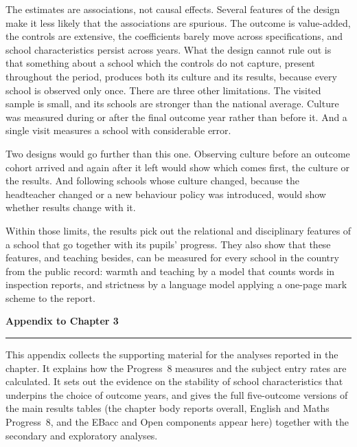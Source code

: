 The estimates are associations, not causal effects. Several features of the design make it less likely that the associations are spurious. The outcome is value-added, the controls are extensive, the coefficients barely move across specifications, and school characteristics persist across years. What the design cannot rule out is that something about a school which the controls do not capture, present throughout the period, produces both its culture and its results, because every school is observed only once. There are three other limitations. The visited sample is small, and its schools are stronger than the national average. Culture was measured during or after the final outcome year rather than before it. And a single visit measures a school with considerable error.

Two designs would go further than this one. Observing culture before an outcome cohort arrived and again after it left would show which comes first, the culture or the results. And following schools whose culture changed, because the headteacher changed or a new behaviour policy was introduced, would show whether results change with it.

Within those limits, the results pick out the relational and disciplinary features of a school that go together with its pupils' progress. They also show that these features, and teaching besides, can be measured for every school in the country from the public record: warmth and teaching by a model that counts words in inspection reports, and strictness by a language model applying a one-page mark scheme to the report.

\clearpage
{}
\begin{center}
  {\LARGE\bfseries Appendix to Chapter 3}\\[6pt]
  \rule{0.5\linewidth}{0.4pt}
\end{center}
\medskip
\noindent This appendix collects the supporting material for the analyses
reported in the chapter. It explains how the Progress~8 measures and the subject entry rates are calculated. It sets out the evidence on the stability of school characteristics that underpins the choice of outcome years, and gives
the full five-outcome versions of the main results tables (the chapter body
reports overall, English and Maths Progress~8, and the EBacc and Open
components appear here) together with the secondary and exploratory
analyses.
\medskip

